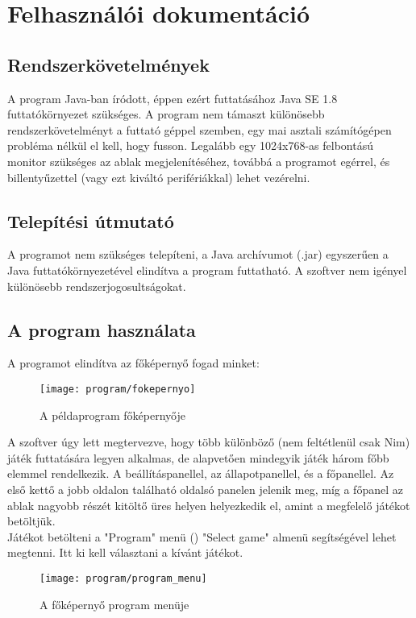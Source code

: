 
\section{Felhasználói dokumentáció}
\subsection{Rendszerkövetelmények}
A program Java-ban íródott, éppen ezért futtatásához Java SE 1.8 futtatókörnyezet szükséges. A program nem támaszt különösebb rendszerkövetelményt a futtató géppel szemben, egy mai asztali számítógépen probléma nélkül el kell, hogy fusson. Legalább egy 1024x768-as felbontású monitor szükséges az ablak megjelenítéséhez, továbbá a programot egérrel, és billentyűzettel (vagy ezt kiváltó perifériákkal) lehet vezérelni.

\subsection{Telepítési útmutató}
A programot nem szükséges telepíteni, a Java archívumot (.jar) egyszerűen a Java futtatókörnyezetével elindítva a program futtatható. A szoftver nem igényel különösebb rendszerjogosultságokat.

\subsection{A program használata}
A programot elindítva az  főképernyő fogad minket:\\
\begin{figure}[h]
	\texttt{[image: program/fokepernyo]}
	\centering
	\caption{A példaprogram főképernyője}
	\label{fig:fokepernyo}
\end{figure}

A szoftver úgy lett megtervezve, hogy több különböző (nem feltétlenül csak Nim) játék futtatására legyen alkalmas, de alapvetően mindegyik játék három főbb elemmel rendelkezik. A beállításpanellel, az állapotpanellel, és a főpanellel. Az első kettő a jobb oldalon található oldalsó panelen jelenik meg, míg a főpanel az ablak nagyobb részét kitöltő üres helyen helyezkedik el, amint a megfelelő játékot betöltjük. \\

Játékot betölteni a "Program" menü () "Select game" almenü segítségével lehet megtenni. Itt ki kell választani a kívánt játékot. 
\begin{figure}[h]
	\texttt{[image: program/program\_menu]}
	\centering
	\caption{A főképernyő program menüje}
	\label{fig:program_menu}
\end{figure}


